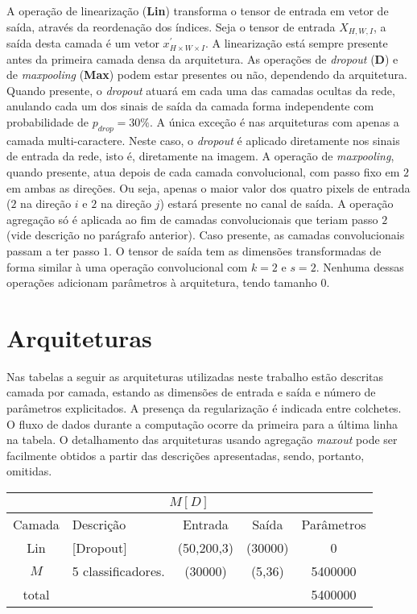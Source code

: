 A operação de linearização (\textbf{Lin}) transforma o tensor de entrada em vetor de saída, através da reordenação dos índices. Seja o tensor de entrada $X_{H, W, I}$, a saída desta camada é um vetor $x^{'}_{H \times W \times I}$. A linearização está sempre presente antes da primeira camada densa da arquitetura. As operações de \textit{dropout} (\textbf{D}) e de \textit{maxpooling} (\textbf{Max}) podem estar presentes ou não, dependendo da arquitetura. Quando presente, o \textit{dropout} atuará em cada uma das camadas ocultas da rede, anulando cada um dos sinais de saída da camada forma independente com probabilidade de $p_{drop} = 30\%$. A única exceção é nas arquiteturas com apenas a camada multi-caractere. Neste caso, o \textit{dropout} é aplicado diretamente nos sinais de entrada da rede, isto é, diretamente na imagem. A operação de \textit{maxpooling}, quando presente, atua depois de cada camada convolucional, com passo fixo em $2$ em ambas as direções. Ou seja, apenas o maior valor dos quatro pixels de entrada ($2$ na direção $i$ e $2$ na direção $j$) estará presente no canal de saída. A operação agregação só é aplicada ao fim de camadas convolucionais que teriam passo $2$ (vide descrição no parágrafo anterior). Caso presente, as camadas convolucionais passam a ter passo $1$. O tensor de saída tem as dimensões transformadas de forma similar à uma operação convolucional com $k = 2$ e $s = 2$. Nenhuma dessas operações adicionam parâmetros à arquitetura, tendo tamanho 0.

\section{Arquiteturas}

Nas tabelas a seguir as arquiteturas utilizadas neste trabalho estão descritas camada por camada, estando as dimensões de entrada e saída e número de parâmetros explicitados. A presença da regularização é indicada entre colchetes. O fluxo de dados durante a computação ocorre da primeira para a última linha na tabela. O detalhamento das arquiteturas usando agregação \textit{maxout} pode ser facilmente obtidos a partir das descrições apresentadas, sendo, portanto, omitidas.

\noindent
\begin{tabularx}{\linewidth}{ |c|X|c|c|c| }
	\multicolumn{5}{c}{$M[D]$} \\ \hline \hline
	Camada & Descrição & Entrada & Saída & Parâmetros \\ \hline
	Lin & [Dropout] & (50,200,3) & (30000) & 0 \\ \hline
	$M$ & 5 classificadores. & (30000) & (5,36) & 5400000 \\ \hline
	total &  &  &  & 5400000 \\ \hline
\end{tabularx}

